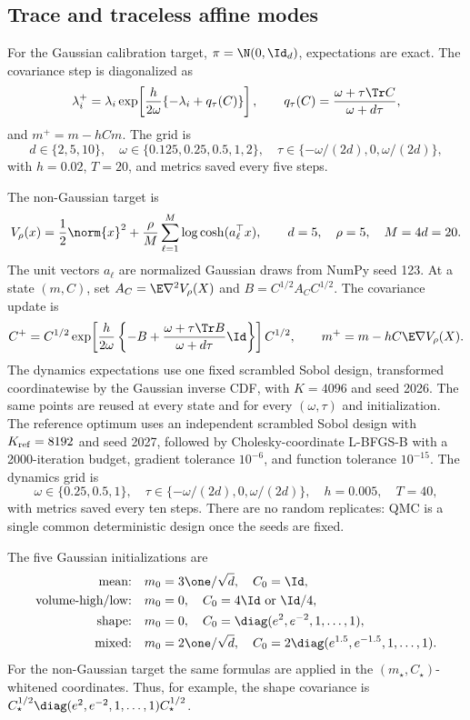 \subsection{Trace and traceless affine modes}

For the Gaussian calibration target, \(\pi=\N(0,\Id_d)\), expectations are
exact.  The covariance step is diagonalized as
\[
  \lambda_i^+
  =\lambda_i\exp\!\left[
     \frac{h}{2\omega}\{-\lambda_i+q_\tau(C)\}
  \right],
  \qquad
  q_\tau(C)=\frac{\omega+\tau\Tr C}{\omega+d\tau},
\]
and \(m^+=m-hCm\).  The grid is
\[
  d\in\{2,5,10\},\quad
  \omega\in\{0.125,0.25,0.5,1,2\},\quad
  \tau\in\{-\omega/(2d),0,\omega/(2d)\},
\]
with \(h=0.02\), \(T=20\), and metrics saved every five steps.

The non-Gaussian target is
\[
  V_\rho(x)=\frac12\norm{x}^2+
  \frac\rho M\sum_{\ell=1}^{M}\log\cosh(a_\ell^\top x),
  \qquad d=5,\quad \rho=5,\quad M=4d=20.
\]
The unit vectors \(a_\ell\) are normalized Gaussian draws from NumPy seed 123.
At a state \((m,C)\), set \(A_C=\E\nabla^2V_\rho(X)\) and
\(B=C^{1/2}A_CC^{1/2}\).  The covariance update is
\[
  C^+=C^{1/2}\exp\!\left[
     \frac{h}{2\omega}
     \left\{-B+
       \frac{\omega+\tau\Tr B}{\omega+d\tau}\Id
     \right\}
  \right]C^{1/2},
  \qquad m^+=m-hC\E\nabla V_\rho(X).
\]
The dynamics expectations use one fixed scrambled Sobol design, transformed
coordinatewise by the Gaussian inverse CDF, with \(K=4096\) and seed 2026.
The same points are reused at every state and for every \((\omega,\tau)\) and
initialization.  The reference optimum uses an independent scrambled Sobol
design with \(K_{\rm ref}=8192\) and seed 2027, followed by Cholesky-coordinate
L-BFGS-B with a 2000-iteration budget, gradient tolerance \(10^{-6}\), and
function tolerance \(10^{-15}\).  The dynamics grid is
\[
  \omega\in\{0.25,0.5,1\},\quad
  \tau\in\{-\omega/(2d),0,\omega/(2d)\},\quad
  h=0.005,\quad T=40,
\]
with metrics saved every ten steps.  There are no random replicates: QMC is a
single common deterministic design once the seeds are fixed.

The five Gaussian initializations are
\begin{align*}
  \text{mean:}&\quad m_0=3\one/\sqrt d,\quad C_0=\Id,\\
  \text{volume-high/low:}&\quad m_0=0,\quad C_0=4\Id\ \text{or}\ \Id/4,\\
  \text{shape:}&\quad m_0=0,\quad
       C_0=\diag(e^2,e^{-2},1,\ldots,1),\\
  \text{mixed:}&\quad m_0=2\one/\sqrt d,\quad
       C_0=2\diag(e^{1.5},e^{-1.5},1,\ldots,1).
\end{align*}
For the non-Gaussian target the same formulas are applied in the
\((m_\star,C_\star)\)-whitened coordinates.  Thus, for example, the shape
covariance is
\(C_\star^{1/2}\diag(e^2,e^{-2},1,\ldots,1)C_\star^{1/2}\).

